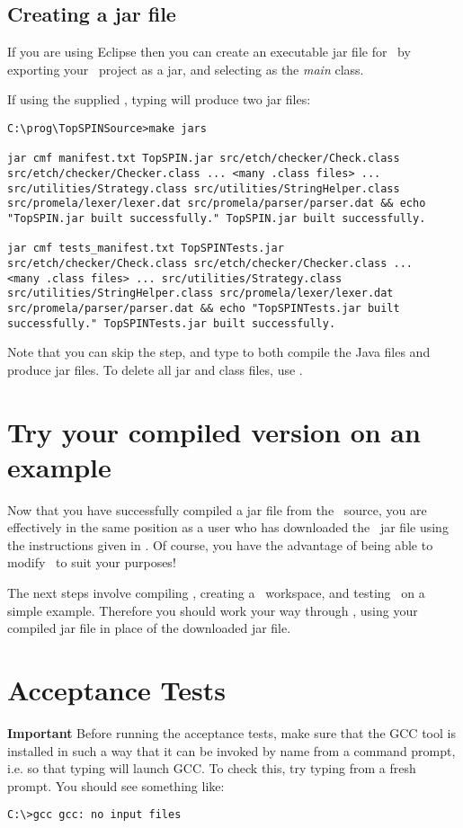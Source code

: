 \subsection{Creating a jar file}
%
If you are using Eclipse then you can create an executable jar file
for \topspin\ by exporting your \topspin\ project as a jar, and
selecting  as the \emph{main} class.

If using the supplied , typing 
will produce two jar files:
%
\begin{lstlisting}
C:\prog\TopSPINSource>make jars

jar cmf manifest.txt TopSPIN.jar src/etch/checker/Check.class
src/etch/checker/Checker.class ... <many .class files> ...
src/utilities/Strategy.class src/utilities/StringHelper.class
src/promela/lexer/lexer.dat src/promela/parser/parser.dat && echo
"TopSPIN.jar built successfully." TopSPIN.jar built successfully.

jar cmf tests_manifest.txt TopSPINTests.jar
src/etch/checker/Check.class src/etch/checker/Checker.class ...
<many .class files> ... src/utilities/Strategy.class
src/utilities/StringHelper.class src/promela/lexer/lexer.dat
src/promela/parser/parser.dat && echo "TopSPINTests.jar built
successfully." TopSPINTests.jar built successfully.
\end{lstlisting}
%
Note that you can skip the  step, and type
 to both compile the Java files and produce jar
files.  To delete all jar and class files, use .

\section{Try your compiled version on an example}

Now that you have successfully compiled a jar file from the
\topspin\ source, you are effectively in the same position as a user
who has downloaded the \topspin\ jar file using the instructions
given in .  Of course, you
have the advantage of being able to modify \topspin\ to suit your
purposes!

The next steps involve compiling \saucy, creating a \gap\ workspace,
and testing \topspin\ on a simple example.  Therefore you should
work your way through , using
your compiled jar file in place of the downloaded jar file.
%
\section{Acceptance Tests}\label{sec:compilingfromsource:testing}

{\bf Important } Before running the acceptance tests, make sure that
the GCC tool is installed in such a way that it can be invoked by
name from a command prompt, i.e. so that typing  will
launch GCC. To check this, try typing  from a fresh
prompt.  You should see something like:
%
\begin{lstlisting}
C:\>gcc gcc: no input files
\end{lstlisting}
